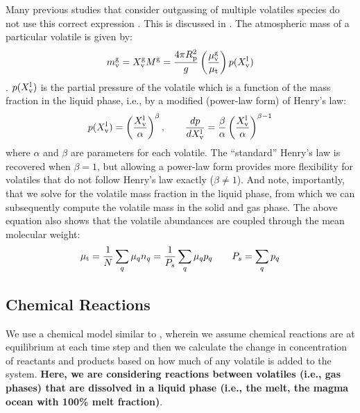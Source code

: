 Many previous studies that consider outgassing of multiple volatiles species do not use this correct expression \citep[e.g.,][]{ET08,LMC13,SMD17,NKT19}.  This is discussed in \cite{BKW19}.  The  atmospheric mass of a particular volatile is given by:
\begin{equation}
m_{\rm v}^{\rm g} = X_{\rm v}^{\rm g} M^{\rm g} = \frac{4 \pi R_{\rm p}^2}{g} \left( \frac{\mu_{\rm v}^{\rm g}}{\mu_{\rm t}} \right) p (X_{\rm v}^{\rm l})
\end{equation}
.  $p(X_{\rm v}^{\rm l})$ is the partial pressure of the volatile which is a function of the mass fraction in the liquid phase, i.e., by a modified (power-law form) of Henry's law:
\begin{equation}
p( X_{\rm v}^{\rm l} ) = \left( \frac{X_{\rm v}^{\rm l}}{\alpha} \right)^\beta, \qquad \frac{dp}{d X_{\rm v}^{\rm l}} = \frac{\beta}{\alpha} \left( \frac{X_{\rm v}^{\rm l}}{\alpha} \right)^{\beta-1}
\label{eq:Henry_mod}
\end{equation}
where $\alpha$ and $\beta$ are parameters for each volatile.  The ``standard'' Henry's law is recovered when $\beta=1$, but allowing a power-law form provides more flexibility for volatiles that do not follow Henry's law exactly ($\beta \neq 1$).  
And note, importantly, that we solve for the volatile mass fraction in the liquid phase, from which we can subsequently compute the volatile mass in the solid and gas phase.  The above equation also shows that the volatile abundances are coupled through the mean molecular weight:
\begin{equation}
\mu_{\rm t} = \frac{1}{N} \sum_q \mu_q n_q = \frac{1}{P_s} \sum_q \mu_q p_q \qquad P_s = \sum_q p_q
\label{eq:atmosphere_molar_mass}
\end{equation}
\subsection{Chemical Reactions}
We use a chemical model similar to \cite{GS14}, wherein we assume chemical reactions are at equilibrium at each time step and then we calculate the change in concentration of reactants and products based on how much of any volatile is added to the system.  \textbf{Here, we are considering reactions between volatiles (i.e., gas phases) that are dissolved in a liquid phase (i.e., the melt, the magma ocean with 100\% melt fraction)}.
